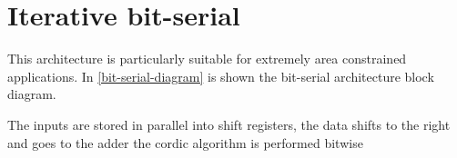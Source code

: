 \section{Iterative bit-serial}\label{sec:bitserial}
This architecture is particularly suitable for extremely area constrained
applications. In \ref{bit-serial-diagram} is shown the bit-serial architecture
block diagram.

The inputs are stored in parallel into shift registers, the data shifts to the
right and goes to the adder the cordic algorithm is performed bitwise 
